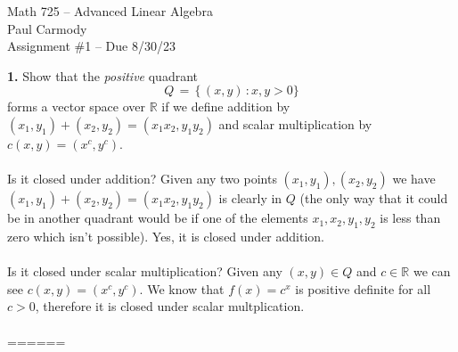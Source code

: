 \documentclass[11pt]{amsart}
\theoremstyle{definition}  %
\newcommand{\R}{\mathbb{R}}
\begin{document}
\begin{center}
\Large{Math 725 -- Advanced Linear Algebra}\\
\large{Paul Carmody}\\
Assignment \#1 -- Due 8/30/23
\end{center}

\vskip 0.25cm
\noindent
{\bf 1.} 
Show that the {\it positive} quadrant 
$$ Q \, = \, \{ \, (x,y) \, :  x,y > 0\}$$
forms a vector space over $\R$  if we define addition by $(x_1,y_1) + (x_2, y_2) = (x_1x_2, y_1y_2)$ and scalar multiplication by $c (x,y) = (x^c, y^c)$.  \\
\\
Is it closed under addition?  Given any two points $(x_1,y_1),(x_2, y_2)$  we have $(x_1,y_1) + (x_2, y_2) = (x_1x_2, y_1y_2)$ is clearly in $Q$ (the only way that it could be in another quadrant would be if one of the elements $x_1,x_2, y_1,y_2$ is less than zero which isn't possible).  Yes, it is closed under addition.\\
\\
Is it closed under scalar multiplication?  Given any $(x,y) \in Q$ and $c \in \R$ we can see $c(x,y)=(x^c, y^c)$. We know that $f(x)=c^x$ is positive definite for all $c>0$, therefore it is closed under scalar multplication.
\\ \\
======
\end{document}

